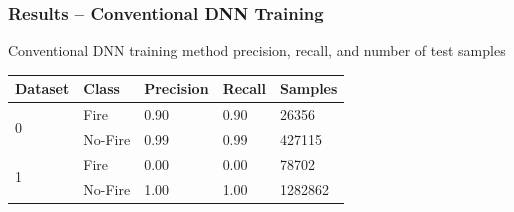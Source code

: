 \documentclass{beamer}
\begin{document}
\begin{frame}
  \frametitle{Results -- Conventional DNN Training}

    \begin{table}
\centering

   \scriptsize Conventional DNN training method precision, recall, and number of test samples
   \\
    \label{tbl:dnn_results}
\begin{tabular}{ |l|l|l|l|l| }
 \hline
Dataset & Class & Precision & Recall & Samples\\ \hline
\multirow{2}{*}{0} 
 & Fire & 0.90 & 0.90  & 26356 \\
 & No-Fire & 0.99 & 0.99 & 427115 \\ 
 \hline

\multirow{2}{*}{1} 
& Fire & 0.00 & 0.00 & 78702 \\
 & No-Fire & 1.00 & 1.00 & 1282862 \\
\hline
\end{tabular}
\end{table}
  \vspace{-0.2cm}
\begin{figure}[ht]
    \scriptsize
{}
\hspace{0.1cm}%
\hspace{0.1cm}%

\label{fig:map_dnn_vl}
\end{figure}


\end{frame}
\end{document}
